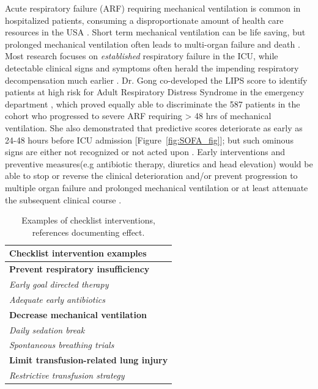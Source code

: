 \documentclass[11pt,notitlepage]{article}
\begin{document}
Acute respiratory failure (ARF) requiring mechanical ventilation is common in hospitalized patients, consuming a disproportionate amount of health care resources in the USA \cite{Wunsch_20639743}. Short term mechanical ventilation can be life saving, but prolonged mechanical ventilation often leads to multi-organ failure and death \cite{Wunsch_20639743, Ranieri_10872010}. Most research focuses on \textit{established} respiratory failure in the ICU, while detectable clinical signs and symptoms often herald the impending respiratory decompensation much earlier \cite{Rohde_23401431}. Dr. Gong co-developed the LIPS score to identify patients at high risk for Adult Respiratory Distress Syndrome in the emergency department \cite{Herridge_12594312}, which proved equally able to discriminate the 587 patients in the cohort who progressed to severe ARF requiring > 48 hrs of mechanical ventilation. She also demonstrated that predictive scores deteriorate as early as 24-48 hours before ICU admission \cite{Yu_24970344} [Figure~\ref{fig:SOFA_fig}]; but such ominous signs are either not recognized or not acted upon \cite{Hillman_12415452,McQuillan_9632403}. Early interventions and preventive measures(e.g antibiotic therapy, diuretics and head elevation) would be able to stop or reverse the clinical deterioration and/or prevent progression to multiple organ failure and prolonged mechanical ventilation or at least attenuate the subsequent clinical course \cite{Naeem_16150531,Rivers_11794169,Rivers_12594312,Mitchell_20378235}. 

\begin{table} 
\vspace{-25pt}
\begin{center}
\begin{tabular}{l}
\toprule
\multicolumn{1}{l}{\footnotesize Checklist intervention examples}\\
\midrule
\footnotesize \textbf{Prevent respiratory insufficiency}\\
\footnotesize \emph{Early goal directed therapy \cite{Levy_23103175}}\\
\footnotesize \emph{Adequate early antibiotics \cite{Lim_19783532}}\\
\footnotesize \textbf{Decrease mechanical ventilation} \\
\footnotesize \emph{Daily sedation break \cite{Barr_23269131}} \\ 
\footnotesize \emph{Spontaneous breathing trials \cite{Girard_18191684}}\\  
\footnotesize \textbf{Limit transfusion-related lung injury}\\
\footnotesize \emph{Restrictive transfusion strategy \cite{Hebert_9971864}}\\
\hline
\end{tabular}\\
\end{center}
\vspace{-20pt}
\caption{\footnotesize Examples of checklist interventions, references documenting effect.} \label{table:Checklist}
\vspace{-10pt}
\end{table} 
\end{document}
